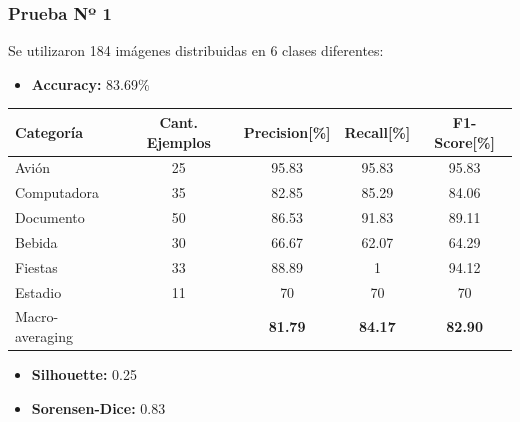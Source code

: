 \begin{frame}[t,fragile]
\frametitle {Prueba Nº 1}
Se utilizaron 184 imágenes distribuidas en 6 clases diferentes:
\begin{itemize}
	\item \textbf{Accuracy:} 83.69\%
\end{itemize}
\begin{table}[t]
	\begin{center}
		\label{tab:prueba1}
		\begin{adjustbox}{max width=\textwidth}
			\begin{tabular}{l|c|c|c|c}
				\textbf{Categoría} & \textbf{Cant. Ejemplos} & \textbf{Precision[\%]} & \textbf{Recall[\%]} & \textbf{F1-Score[\%]} \\
				\hline
				Avión & 25 & 95.83 & 95.83 & 95.83\\
				
				Computadora & 35 & 82.85 & 85.29 & 84.06\\
				
				Documento & 50 & 86.53 & 91.83 & 89.11\\
				
				Bebida & 30 & 66.67 & 62.07 & 64.29\\
				
				Fiestas & 33 & 88.89 & 1 & 94.12\\
				
				Estadio & 11 & 70 & 70 & 70\\
				
				Macro-averaging &  & \textbf{81.79} & \textbf{84.17} & \textbf{82.90}\\
				\hline	
			\end{tabular}
		\end{adjustbox}
	\end{center}
\end{table}
\begin{itemize}
	\item \textbf{Silhouette:} 0.25
	\item \textbf{Sorensen-Dice:} 0.83
\end{itemize}
\end{frame}

